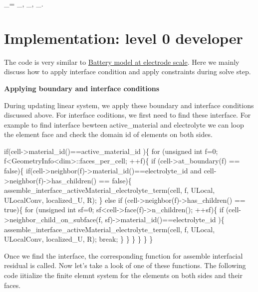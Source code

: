 _= \quad {} \Gamma_, \Gamma_, \Gamma_. \]  \hypertarget{battery_particle_Implementation}{}\section{Implementation\-: level 0 developer}\label{battery_particle_Implementation}
The code is very similar to \hyperlink{battery_electrode_scale}{Battery model at electrode scale}. Here we mainly discuss how to apply interface condition and apply constraints during solve step.

{\bfseries Applying boundary and interface conditions}\par
 During updating linear system, we apply these boundary and interface conditions discussed above. For interface coditions, we first need to find these interface. For example to find interface bewteen active\-\_\-material and electrolyte we can loop the element face and check the domain id of elements on both sides. 
\begin{DoxyCode}
\textcolor{keywordflow}{if}(cell->material\_id()==active\_material\_id  )\{
    \textcolor{keywordflow}{for} (\textcolor{keywordtype}{unsigned} \textcolor{keywordtype}{int} f=0; f<GeometryInfo<dim>::faces\_per\_cell; ++f)\{
        \textcolor{keywordflow}{if} (cell->at\_boundary(f) == \textcolor{keyword}{false})\{
            \textcolor{keywordflow}{if}(cell->neighbor(f)->material\_id()==electrolyte\_id  and cell->neighbor(f)->has\_children() == \textcolor{keyword}{
      false})\{
              assemble\_interface\_activeMaterial\_electrolyte\_term(cell, f, ULocal, ULocalConv, localized\_U, 
      R);                                          
            \}
            \textcolor{keywordflow}{else} \textcolor{keywordflow}{if} (cell->neighbor(f)->has\_children() == \textcolor{keyword}{true})\{
                \textcolor{keywordflow}{for} (\textcolor{keywordtype}{unsigned} \textcolor{keywordtype}{int} sf=0; sf<cell->face(f)->n\_children(); ++sf)\{
                    \textcolor{keywordflow}{if} (cell->neighbor\_child\_on\_subface(f, sf)->material\_id()==electrolyte\_id )\{
                      assemble\_interface\_activeMaterial\_electrolyte\_term(cell, f, ULocal, ULocalConv, 
      localized\_U, R);                                                                
                        \textcolor{keywordflow}{break};
                    \}
                \}
            \}
        \}
    \}
\}
\end{DoxyCode}
 Once we find the interface, the corresponding function for assemble interfacial residual is called. Now let's take a look of one of these functions. The following code iitialize the finite elemnt system for the elements on both sides and their faces. 
